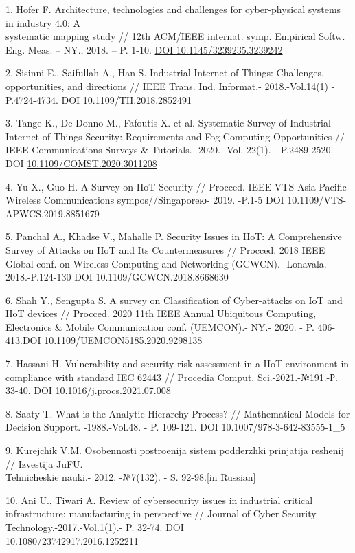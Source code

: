 \begin{references}
1. Hofer F. Architecture, technologies and challenges for cyber-physical
systems in industry 4.0: A \\systematic mapping study // 12th ACM/IEEE
internat. symp. Empirical Softw. Eng. Meas. -- NY., 2018. -- P. 1-10.
\href{https://doi.org/10.1145/3239235.3239242}{DOI
10.1145/3239235.3239242}

2. Sisinni E., Saifullah A., Han S. Industrial Internet of Things:
Challenges, opportunities, and directions // IEEE Trans. Ind. Informat.-
2018.-Vol.14(1) - P.4724-4734. DOI \href{https://doi.org/10.1109/TII.2018.2852491}{10.1109/TII.2018.2852491}

3. Tange K., De Donno M., Fafoutis X. et al. Systematic Survey of
Industrial Internet of Things Security: Requirements and Fog Computing
Opportunities // IEEE Communications Surveys \& Tutorials.- 2020.- Vol.
22(1). - P.2489-2520. DOI
\href{http://dx.doi.org/10.1109/COMST.2020.3011208}{10.1109/COMST.2020.3011208}

4. Yu X., Guo H. A Survey on IIoT Security // Procced. IEEE VTS Asia
Pacific Wireless Communications sympos//Singaporeю- 2019. -P.1-5 DOI
10.1109/VTS-APWCS.2019.8851679

5. Panchal A., Khadse V., Mahalle P. Security Issues in IIoT: A
Comprehensive Survey of Attacks on IIoT and Its Countermeasures //
Procced. 2018 IEEE Global conf. on Wireless Computing and Networking
(GCWCN).- Lonavala.- 2018.-P.124-130 DOI 10.1109/GCWCN.2018.8668630

6. Shah Y., Sengupta S. A survey on Classification of Cyber-attacks on
IoT and IIoT devices // Procced. 2020 11th IEEE Annual Ubiquitous
Computing, Electronics \& Mobile Communication conf. (UEMCON).- NY.-
2020. - P. 406-413.DOI 10.1109/UEMCON5185.2020.9298138

7. Hassani H. Vulnerability and security risk assessment in a IIoT
environment in compliance with standard IEC 62443 // Procedia Comput.
Sci.-2021.-№191.-Р. 33-40.
DOI 10.1016/j.procs.2021.07.008

8. Saaty T. What is the Analytic Hierarchy Process? // Mathematical
Models for Decision Support. -1988.-Vol.48. - P. 109-121. DOI
10.1007/978-3-642-83555-1\_5

9. Kurejchik V.M. Osobennosti postroenija sistem podderzhki prinjatija
reshenij // Izvestija JuFU. \\Tehnicheskie nauki.- 2012. -№7(132). - S.
92-98.{[}in Russian{]}

10. Ani U., Tiwari A. Review of cybersecurity issues in industrial
critical infrastructure: manufacturing in perspective // Journal of
Cyber Security Technology.-2017.-Vol.1(1).- P. 32-74. DOI\\
10.1080/23742917.2016.1252211


\end{references}
